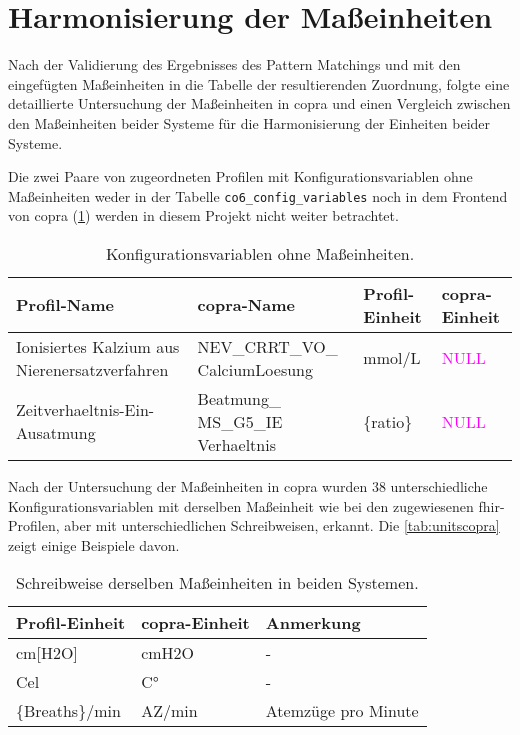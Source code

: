 \section{Harmonisierung der Maßeinheiten} \label{sec:unitscopra}

Nach der Validierung des Ergebnisses des Pattern Matchings und mit den eingefügten Maßeinheiten in die Tabelle der resultierenden Zuordnung, folgte eine detaillierte Untersuchung der Maßeinheiten in \ac{copra} und einen Vergleich zwischen den Maßeinheiten beider Systeme für die Harmonisierung der Einheiten beider Systeme.

Die zwei Paare von zugeordneten Profilen mit Konfigurationsvariablen ohne Maßeinheiten weder in der Tabelle \texttt{co6\_config\_variables} noch in dem Frontend von \ac{copra} (\ref{tab:nounitscopra}) werden in diesem Projekt nicht weiter betrachtet.

\clearpage

\begin{table}[ht]
	\centering
	\caption[Konfigurationsvariablen ohne Maßeinheiten]{Konfigurationsvariablen ohne Maßeinheiten.}
	\label{tab:nounitscopra}
	\begin{tabular}{|p{3cm}|p{3cm}|l|l|} \hline
		\bfseries Profil-Name & \bfseries \ac{copra}-Name & \bfseries Profil-Einheit &  \bfseries \ac{copra}-Einheit \\ \hline
		Ionisiertes Kalzium aus Nierenersatzverfahren & NEV\_CRRT\_VO\_ CalciumLoesung & mmol/L & \textcolor{magenta}{NULL} \\ \hline
		Zeitverhaeltnis-Ein-Ausatmung & Beatmung\_ MS\_G5\_IE Verhaeltnis & \{ratio\}  & \textcolor{magenta}{NULL} \\ \hline		
	\end{tabular}
\end{table}

 Nach der Untersuchung der Maßeinheiten in \ac{copra} wurden 38 unterschiedliche Konfigurationsvariablen mit derselben Maßeinheit wie bei den zugewiesenen \ac{fhir}-Profilen, aber mit unterschiedlichen Schreibweisen, erkannt. Die \ref{tab:unitscopra} zeigt einige Beispiele davon.

\begin{table}[ht]
	\centering
	\caption[Schreibweisen derselben Maßeinheiten in beiden Systemen]{Schreibweise derselben Maßeinheiten in beiden Systemen.}
	\label{tab:unitscomii}
	\begin{tabular}{|l|l|l|} \hline
		\bfseries Profil-Einheit & \bfseries \ac{copra}-Einheit & \bfseries Anmerkung \\ \hline
		cm[H2O] & cmH2O & - \\ \hline
		Cel & C° & - \\ \hline
		\{Breaths\}/min & AZ/min & Atemzüge pro Minute \\ \hline
	\end{tabular}
\end{table}

